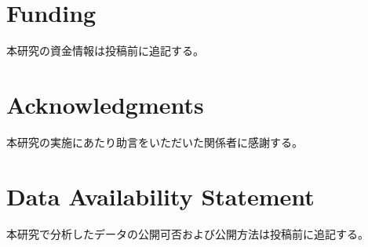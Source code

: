\documentclass[utf8]{FrontiersinHarvard}
\begin{document}
\section*{Funding}
本研究の資金情報は投稿前に追記する。

\section*{Acknowledgments}
本研究の実施にあたり助言をいただいた関係者に感謝する。

\section*{Data Availability Statement}
本研究で分析したデータの公開可否および公開方法は投稿前に追記する。



\end{document}
